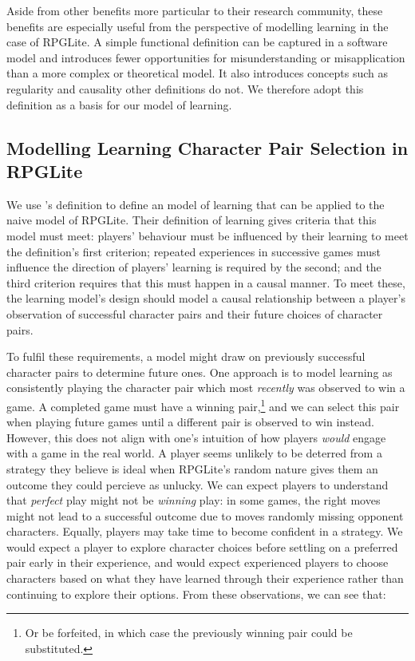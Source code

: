 Aside from other benefits more particular to their research community, these
benefits are especially useful from the perspective of modelling learning in the
case of RPGLite. A simple functional definition can be captured in a software
model and introduces fewer opportunities for misunderstanding or misapplication
than a more complex or theoretical model. It also introduces  concepts such as
regularity and causality other definitions do not. We therefore adopt this
definition as a basis for our model of learning.



\subsection{Modelling Learning Character Pair Selection in RPGLite}
\label{subsec:defining_our_models_of_learning}
\label{learning_model_details}


We use \citet{de2013learning}'s definition to define an \aspectoriented{} model
of learning that can be applied to the naive model of RPGLite. Their definition
of learning gives criteria that this model must meet: players' behaviour must be
influenced by their learning to meet the definition's first criterion; repeated
experiences in successive games must influence the direction of players'
learning is required by the second; and the third criterion requires that this
must happen in a causal manner. To meet these, the learning model's design
should model a causal relationship between a player's observation of successful
character pairs and their future choices of character pairs.

To fulfil these requirements, a model might draw on previously successful
character pairs to determine future ones. One approach is to model learning as
consistently playing the character pair which most \emph{recently} was observed
to win a game. A completed game must have a winning pair,\footnote{Or be
forfeited, in which case the previously winning pair could be substituted.} and
we can select this pair when playing future games until a different pair is
observed to win instead. However, this does not align with one's intuition of
how players \emph{would} engage with a game in the real world. A player seems
unlikely to be deterred from a strategy they believe is ideal when RPGLite's
random nature gives them an outcome they could percieve as unlucky. We can
expect players to understand that \emph{perfect} play might not be
\emph{winning} play: in some games, the right moves might not lead to a
successful outcome due to moves randomly missing opponent characters. Equally,
players may take time to become confident in a strategy. We would expect a
player to explore character choices before settling on a preferred pair early in
their experience, and would expect experienced players to choose characters
based on what they have learned through their experience rather
than continuing to explore their options. From these observations, we can see that:

